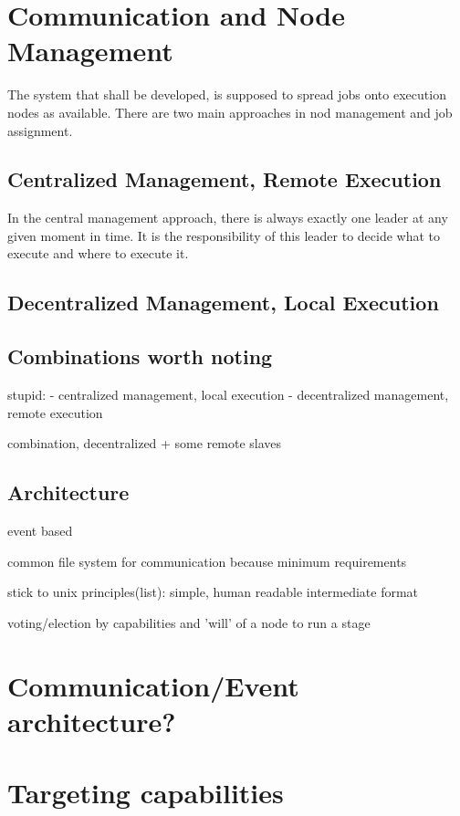 \section{Communication and Node Management}

The system that shall be developed, is supposed to spread jobs onto execution nodes as available.
There are two main approaches in nod management and job assignment.



\subsection{Centralized Management, Remote Execution}

In the central management approach, there is always exactly one leader at any given moment in time.
It is the responsibility of this leader to decide what to execute and where to execute it.

\subsection{Decentralized Management, Local Execution}

\subsection{Combinations worth noting}

stupid:
 - centralized management, local execution
 - decentralized management, remote execution
 
combination, decentralized + some remote slaves

\subsection{Architecture}

event based

common file system for communication because minimum requirements

stick to unix principles(list): simple, human readable intermediate format

voting/election by capabilities and 'will' of a node to run a stage

\section{Communication/Event architecture?}

\section{Targeting capabilities}

